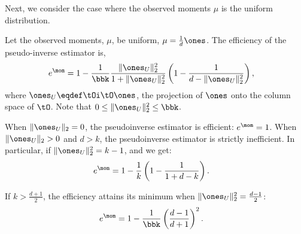 Next, we consider the case where the observed moments $\mu$ is the
uniform distribution.

\begin{lemma}
  Let the observed moments, $\mu$, be uniform, $\mu = \frac{1}{d} \ones$. 
  The efficiency of the pseudo-inverse estimator is, 
  \begin{align}
    e^\mom &= 
    1 - \frac{1}{\bbk}\frac{\|\ones_U\|_2^2}{1 + \|\ones_U\|_2^2} \left( 1 - \frac{1}{d - \|\ones_U\|_2^2} \right),
  \end{align}
  where $\ones_U \eqdef \tOi\tO \ones$, the projection of $\ones$ onto
  the column space of $\tO$. Note that $0 \le \|\ones_U\|^2_2 \le \bbk$.

  When $\|\ones_U\|_2 = 0$, the pseudoinverse estimator is efficient:
  $e^\mom = 1$. When $\|\ones_U\|_2 > 0$ and $d > k$, the pseudoinverse
  estimator is strictly inefficient. 
  In particular, if $\|\ones_U\|^2_2
    = k-1$, and we get:
    \begin{align}
      e^\mom 
      &= 1 - \frac{1}{k} \left(1 - \frac{1}{1 + d - k} \right) \label{eqn:k-eff}.
    \end{align}

    If $k > \frac{d+1}{2}$, the efficiency attains its minimum when
    $\|\ones_U\|^2_2 = \frac{d-1}{2}$:
  \begin{align*}
    e^\mom 
    &= 1 - \frac{1}{\bbk} \left( \frac{d-1}{d+1} \right)^2.
  \end{align*}
\end{lemma}

